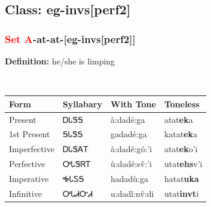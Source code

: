 \subsection*{Class: eg-invs[perf2]}
\nopagebreak
\needspace{2in}
\subsubsection*{\textcolor{Red}{Set A}{-}at{-}\textbf{at}{-}[eg-invs[perf2]]}
\nopagebreak
\textbf{Definition: } he/she is limping
\\[0.5em]
\begin{tabularx}{\textwidth}{l X X X}%
\toprule%
\textbf{Form}&\textbf{Syllabary}&\textbf{With Tone}&\textbf{Toneless}\\%
\midrule%
Present&ᎠᏓᏕᎦ&à:dadé:ga&atat\textbf{ek}a\\%
1st Present&ᎦᏓᏕᎦ&gadadé:ga&katat\textbf{ek}a\\%
Imperfective&ᎠᏓᏕᎪᎢ&à:dadé:gó:’i&atat\textbf{ek}o'i\\%
Perfective&ᎤᏓᏕᏒᎢ&ù:dadé:sv̌:’i&utat\textbf{ehs}v'i\\%
Imperative&ᎭᏓᏚᎦ&hadadù:ga&hatat\textbf{uka}\\%
Infinitive&ᎤᏓᏗᏅᏗ&u:dadǐ:nv̂:di&utat\textbf{invt}i\\%
\bottomrule%
\end{tabularx}
\\[1em]